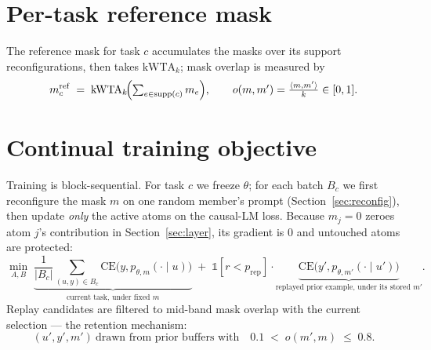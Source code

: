 \documentclass[11pt]{article}
\newcommand{\kwta}{\mathrm{kWTA}_k}
\newcommand{\CE}{\mathrm{CE}}
\begin{document}
\section{Per-task reference mask}
The reference mask for task $c$ accumulates the masks over its support
reconfigurations, then takes $\kwta$; mask overlap is measured by
\begin{equation}
  m^{\mathrm{ref}}_c \;=\; \kwta\!\Bigl( \textstyle\sum_{e \in \mathrm{supp}(c)} m_e \Bigr),
  \qquad
  o(m, m') = \frac{\langle m, m'\rangle}{k} \in [0,1].
\end{equation}

\section{Continual training objective}
Training is block-sequential. For task $c$ we freeze $\theta$; for each batch
$B_c$ we first reconfigure the mask $m$ on one random member's prompt
(Section~\ref{sec:reconfig}), then update \emph{only} the active atoms on the
causal-LM loss. Because $m_j = 0$ zeroes atom $j$'s contribution in
Section~\ref{sec:layer}, its gradient is $0$ and untouched atoms are protected:
\begin{equation}
  \min_{A,B}\;
  \underbrace{\frac{1}{|B_c|}\sum_{(u,y)\in B_c} \CE\bigl(y, p_{\theta,m}(\cdot\mid u)\bigr)}_{\text{current task, under fixed }m}
  \;+\;
  \mathbb{1}[r<p_{\mathrm{rep}}]\cdot
  \underbrace{\CE\bigl(y', p_{\theta,m'}(\cdot\mid u')\bigr)}_{\text{replayed prior example, under its stored }m'} .
\end{equation}
Replay candidates are filtered to mid-band mask overlap with the current
selection --- the retention mechanism:
\begin{equation}
  (u', y', m')\ \text{drawn from prior buffers with}\quad
  0.1 \;<\; o(m', m) \;\le\; 0.8 .
\end{equation}
\end{document}
